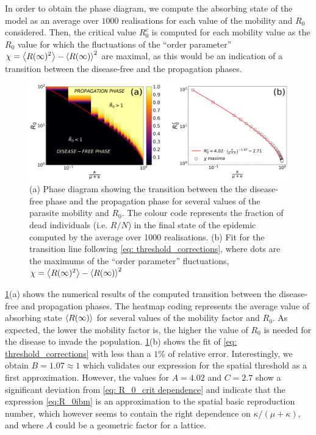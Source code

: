 In order to obtain the phase diagram, we compute the absorbing state of the
model as an average over $1000$ realisations for each value of the mobility and
$R_0$ considered. Then, the critical value $R_0^c$ is computed for each
mobility value as the $R_0$ value for which the fluctuations of the ``order
parameter'' $\displaystyle \chi=\left<{R(\infty})^2\right>-\left<R(\infty)\right>^2$ are
maximal, as this would be an indication of a transition between the
disease-free and the propagation phases.

\begin{figure}[H]
    \centering
    \includegraphics[width=1\textwidth]{Figures/PhaseDiagram.png}
    \caption[
        Phase diagram and fit for the transition between the disease-free and
        propagation phases]{(a) Phase diagram showing the transition between
        the the
        disease-free phase and the propagation phase for several values of the
        parasite
        mobility and $R_0$. The colour code represents the fraction of dead
        individuals
        (i.e. $R/N$) in the final state of the epidemic computed by the average
        over
        1000 realisations. (b) Fit for the transition line following \cref{eq:
            threshold_corrections}, where dots are the maximums of the ``order
        parameter''
        fluctuations, $\chi=\left<{R(\infty})^2\right>-\left<R(\infty)\right>^2$}
    \label{fig:Phase_diagram}
\end{figure}

\cref{fig:Phase_diagram}(a) shows the numerical results of the computed
transition between the disease-free and propagation phases. The heatmap coding
represents the average value of absorbing state $\left<R(\infty)\right>$ for several
values of the mobility factor and $R_0$. As expected, the lower the mobility
factor is, the higher the value of $R_0$ is needed for the disease to invade
the population. \cref{fig:Phase_diagram}(b) shows the fit of \cref{eq:
    threshold_corrections} with less than a $1\%$ of relative error.
Interestingly,
we obtain $B=1.07\approx1$ which validates our expression for the spatial
threshold as a first approximation. However, the values for $A=4.02$ and
$C=2.7$ show a significant deviation from \cref{eq: R_0_crit dependence} and
indicate that the expression \cref{eq:R_0ibm} is  an approximation to the
spatial basic reproduction number, which however seems to contain the right
dependence on $\kappa/(\mu+\kappa)$, and where $A$ could be a geometric factor
for a lattice.

